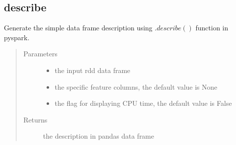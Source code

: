 \documentclass[letterpaper,12pt,english]{sphinxmanual}
\begin{document}
\subsection{describe}
\label{\detokenize{basics:describe}}

\begin{fulllineitems}
Generate the simple data frame description using \(.describe()\) function in pyspark.
\begin{quote}\begin{description}
\item[{Parameters}] \leavevmode\begin{itemize}
\item {} 
 \textendash{} the input rdd data frame

\item {} 
 \textendash{} the specific feature columns, the default value is None

\item {} 
 \textendash{} the flag for displaying CPU time, the default value is False

\end{itemize}

\item[{Returns}] \leavevmode
the description in pandas data frame

\end{description}\end{quote}


\end{fulllineitems}
\end{document}

